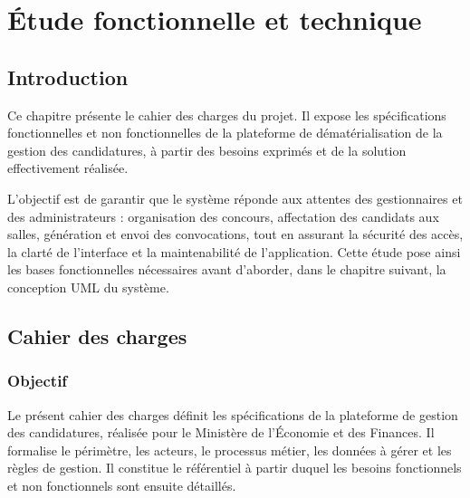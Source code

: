 \chapter{Étude fonctionnelle et technique}
\thispagestyle{MyStyle}
\begin{onehalfspace}

\newcommand{\tabrf}[3]{%
\begin{table}[H]
\centering
\caption{#1}
\label{#2}
\begin{spacing}{1}
\resizebox{\textwidth}{!}{%
\begin{tabular}{|p{1.7cm}|p{9.4cm}|p{4.0cm}|}
\hline
\rowcolor[HTML]{C9DAF8}
\textbf{ID} & \textbf{Besoin} & \textbf{Acteur} \\
\hline
#3
\end{tabular}%
}
\end{spacing}
\end{table}%
}

\section{Introduction}

Ce chapitre présente le cahier des charges du projet. Il expose les spécifications fonctionnelles et non fonctionnelles de la plateforme de dématérialisation de la gestion des candidatures, à partir des besoins exprimés et de la solution effectivement réalisée.

L'objectif est de garantir que le système réponde aux attentes des gestionnaires et des administrateurs : organisation des concours, affectation des candidats aux salles, génération et envoi des convocations, tout en assurant la sécurité des accès, la clarté de l'interface et la maintenabilité de l'application. Cette étude pose ainsi les bases fonctionnelles nécessaires avant d'aborder, dans le chapitre suivant, la conception UML du système.

\section{Cahier des charges}

\subsection{Objectif}

Le présent cahier des charges définit les spécifications de la plateforme de gestion des candidatures, réalisée pour le Ministère de l'Économie et des Finances. Il formalise le périmètre, les acteurs, le processus métier, les données à gérer et les règles de gestion. Il constitue le référentiel à partir duquel les besoins fonctionnels et non fonctionnels sont ensuite détaillés.


\end{onehalfspace}

